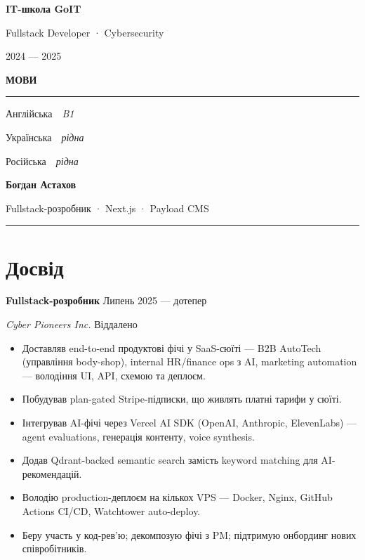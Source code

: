 \documentclass[11pt,a4paper]{article}
\newcommand{\sidebarwidth}{5.8cm}
\newcommand{\sbsection}[1]{%
  \vspace{12pt}\par%
  {\color{accentLite}\normalsize\bfseries\MakeUppercase{#1}}\par%
  \vspace{2pt}%
  {\color{accent!60}\rule{\linewidth}{0.4pt}}\par%
  \vspace{4pt}%
}
\begin{document}
\begin{minipage}[t]{\sidebarwidth}
\begin{minipage}[t]{\dimexpr\sidebarwidth-1.4cm\relax}
{\bfseries IT-школа GoIT}\par
Fullstack Developer · Cybersecurity\par
{\color{accentLite}2024 — 2025}

\sbsection{Мови}
Англійська\ \ {\color{sidebardim}\itshape B1}\par\vspace{4pt}
Українська\ \ {\color{sidebardim}\itshape рідна}\par\vspace{4pt}
Російська\ \ {\color{sidebardim}\itshape рідна}

\end{minipage}
\end{minipage}%
%
\begin{minipage}[t]{\dimexpr\paperwidth-\sidebarwidth\relax}
\vspace*{1.1cm}\hspace{0.6cm}%
\begin{minipage}[t]{\dimexpr\paperwidth-\sidebarwidth-1.8cm\relax}

{\Huge\bfseries\color{darkgray}Богдан Астахов}\par
\vspace{3pt}
{\large\color{midgray}Fullstack-розробник · Next.js · Payload CMS}\par
\vspace{6pt}
{\color{accent}\rule{\linewidth}{1.2pt}}

\section*{Досвід}

{\bfseries Fullstack-розробник} \hfill {\color{midgray}\small Липень 2025 — дотепер}\par
{\itshape Cyber Pioneers Inc.} \hfill {\color{midgray}\small Віддалено}
\begin{itemize}
  \item Доставляв end-to-end продуктові фічі у SaaS-сюїті —
        B2B AutoTech (управління body-shop), internal HR/finance ops
        з AI, marketing automation — володіння UI, API, схемою та
        деплоєм.
  \item Побудував plan-gated Stripe-підписки, що живлять платні тарифи
        у сюїті.
  \item Інтегрував AI-фічі через Vercel AI SDK (OpenAI, Anthropic,
        ElevenLabs) — agent evaluations, генерація контенту,
        voice synthesis.
  \item Додав Qdrant-backed semantic search замість keyword matching
        для AI-рекомендацій.
  \item Володію production-деплоєм на кількох VPS — Docker, Nginx,
        GitHub Actions CI/CD, Watchtower auto-deploy.
  \item Беру участь у код-рев'ю; декомпозую фічі з PM; підтримую
        онбординг нових співробітників.
\end{itemize}


\end{minipage}
\end{minipage}
\end{document}
